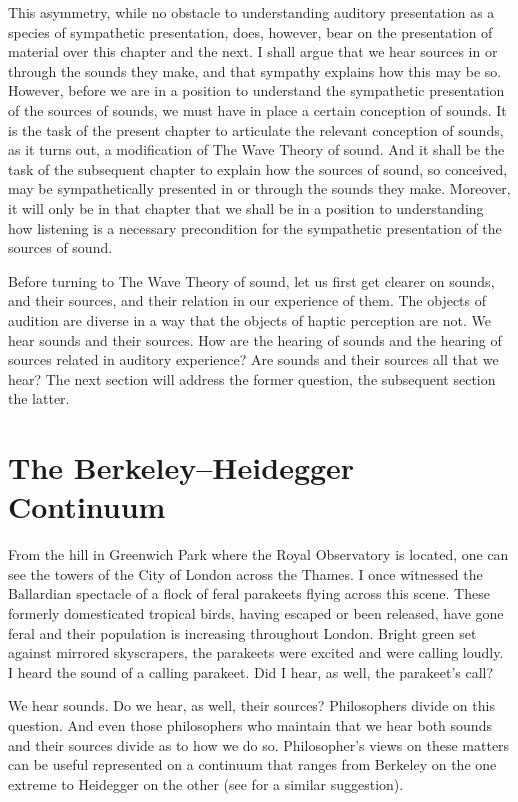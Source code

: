 This asymmetry, while no obstacle to understanding auditory presentation as a species of sympathetic presentation, does, however, bear on the presentation of material over this chapter and the next. I shall argue that we hear sources in or through the sounds they make, and that sympathy explains how this may be so. However, before we are in a position to understand the sympathetic presentation of the sources of sounds, we must have in place a certain conception of sounds. It is the task of the present chapter to articulate the relevant conception of sounds, as it turns out, a modification of The Wave Theory of sound. And it shall be the task of the subsequent chapter to explain how the sources of sound, so conceived, may be sympathetically presented in or through the sounds they make. Moreover, it will only be in that chapter that we shall be in a position to understanding how listening is a necessary precondition for the sympathetic presentation of the sources of sound.

Before turning to The Wave Theory of sound, let us first get clearer on sounds, and their sources, and their relation in our experience of them. The objects of audition are diverse in a way that the objects of haptic perception are not. We hear sounds and their sources. How are the hearing of sounds and the hearing of sources related in auditory experience? Are sounds and their sources all that we hear? The next section will address the former question, the subsequent section the latter.


\section{The Berkeley--Heidegger Continuum} %
\label{sec:the_berkeley_heidegger_continuum}

From the hill in Greenwich Park where the Royal Observatory is located, one can see the towers of the City of London across the Thames. I once witnessed the Ballardian spectacle of a flock of feral parakeets flying across this scene. These formerly domesticated tropical birds, having escaped or been released, have gone feral and their population is increasing throughout London. Bright green set against mirrored skyscrapers, the parakeets were excited and were calling loudly. I heard the sound of a calling parakeet. Did I hear, as well, the parakeet's call?

We hear sounds. Do we hear, as well, their sources? Philosophers divide on this question. And even those philosophers who maintain that we hear both sounds and their sources divide as to how we do so. Philosopher's views on these matters can be useful represented on a continuum that ranges from Berkeley on the one extreme to Heidegger on the other (see \citealt{Leddington:2014aa} for a similar suggestion). 

